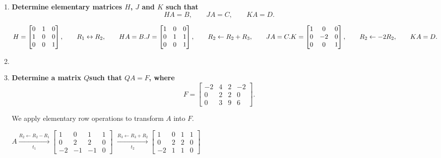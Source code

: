 \begin{enumerate}[label=\alph*)]

\item \textbf{Determine elementary matrices
    $H$, $J$ and $K$ such that}
    $$
        HA=B,\qquad JA=C,\qquad KA=D.
    $$

    \begin{answer}
        $H=
        \begin{bmatrix}
            0 & 1 & 0 \\
            1 & 0 & 0 \\
            0 & 0 & 1
        \end{bmatrix},
        \qquad
        R_1 \leftrightarrow R_2,
        \qquad HA=B.
        \\[1.0em]
        J=
        \begin{bmatrix}
            1 & 0 & 0 \\
            0 & 1 & 1 \\
            0 & 0 & 1
        \end{bmatrix},
        \qquad
        R_2 \leftarrow R_2+R_3,
        \qquad JA=C.
        \\[1.0em]
        K=
        \begin{bmatrix}
            1 & 0 & 0 \\
            0 & -2 & 0 \\
            0 & 0 & 1
        \end{bmatrix},
        \qquad
        R_2 \leftarrow -2R_2,
        \qquad KA=D.
        $ \\[1.0em]
    \end{answer}

\item 

\item \textbf{Determine a matrix $Q$such that $QA=F$, where}
    $$
    F=
    \begin{bmatrix}
        -2 & 4 & 2 & -2 \\
         0 & 2 & 2 & 0 \\
         0 & 3 & 9 & 6
    \end{bmatrix}.
    $$
    
    \begin{answer}
        We apply elementary row operations to transform $A$ into $F$.

        $A \xrightarrow[t_1]{R_2 \leftarrow R_2-R_1}
        \begin{bmatrix}
            1 &  0 &  1 & 1 \\
            0 &  2 &  2 & 0 \\
            -2 & -1 & -1 & 0
        \end{bmatrix}
        $
        $\xrightarrow[t_2]{R_3 \leftarrow R_3+R_2}
        \begin{bmatrix}
            1 &  0 & 1 & 1 \\
            0 &  2 & 2 & 0 \\
            -2 &  1 & 1 & 0
        \end{bmatrix}
        $ \\[1.0em]


\end{answer}
\end{enumerate}
